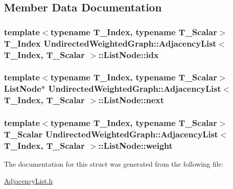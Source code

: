 \subsection{Member Data Documentation}
\hypertarget{struct_undirected_weighted_graph_1_1_adjacency_list_1_1_list_node_ae35b343eda23b364db9d9239d9f0ce24}{
\subsubsection[{idx}]{\setlength{\rightskip}{0pt plus 5cm}template$<$typename T\+\_\+\+Index, typename T\+\_\+\+Scalar$>$ T\+\_\+\+Index {\bf Undirected\+Weighted\+Graph\+::\+Adjacency\+List}$<$ T\+\_\+\+Index, T\+\_\+\+Scalar $>$\+::List\+Node\+::idx}}\label{struct_undirected_weighted_graph_1_1_adjacency_list_1_1_list_node_ae35b343eda23b364db9d9239d9f0ce24}
\hypertarget{struct_undirected_weighted_graph_1_1_adjacency_list_1_1_list_node_a6f0bbab55afd9ce7a56a14d83816f141}{
\subsubsection[{next}]{\setlength{\rightskip}{0pt plus 5cm}template$<$typename T\+\_\+\+Index, typename T\+\_\+\+Scalar$>$ {\bf List\+Node}$\ast$ {\bf Undirected\+Weighted\+Graph\+::\+Adjacency\+List}$<$ T\+\_\+\+Index, T\+\_\+\+Scalar $>$\+::List\+Node\+::next}}\label{struct_undirected_weighted_graph_1_1_adjacency_list_1_1_list_node_a6f0bbab55afd9ce7a56a14d83816f141}
\hypertarget{struct_undirected_weighted_graph_1_1_adjacency_list_1_1_list_node_ad7d0aedb78ca2bf0ae2e9c55a8a32596}{
\subsubsection[{weight}]{\setlength{\rightskip}{0pt plus 5cm}template$<$typename T\+\_\+\+Index, typename T\+\_\+\+Scalar$>$ T\+\_\+\+Scalar {\bf Undirected\+Weighted\+Graph\+::\+Adjacency\+List}$<$ T\+\_\+\+Index, T\+\_\+\+Scalar $>$\+::List\+Node\+::weight}}\label{struct_undirected_weighted_graph_1_1_adjacency_list_1_1_list_node_ad7d0aedb78ca2bf0ae2e9c55a8a32596}


The documentation for this struct was generated from the following file\+:\begin{DoxyCompactItemize}
\item 
\hyperlink{_adjacency_list_8h}{Adjacency\+List.\+h}\end{DoxyCompactItemize}
